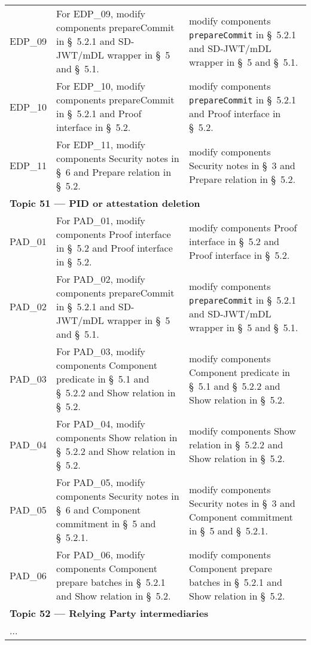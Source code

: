 \begin{landscape}
\begin{longtable}{p{3cm} p{10cm} p{7cm}}
EDP\_09 &
For EDP\_09, modify components prepareCommit in \S~5.2.1 and SD-JWT/mDL wrapper in \S~5 and \S~5.1. &
modify components \texttt{prepareCommit} in \S~5.2.1 and SD-JWT/mDL wrapper in \S~5 and \S~5.1. \\

EDP\_10 &
For EDP\_10, modify components prepareCommit in \S~5.2.1 and Proof interface in \S~5.2. &
modify components \texttt{prepareCommit} in \S~5.2.1 and Proof interface in \S~5.2. \\

EDP\_11 &
For EDP\_11, modify components Security notes in \S~6 and Prepare relation in \S~5.2. &
modify components Security notes in \S~3 and Prepare relation in \S~5.2. \\[1em]


\multicolumn{3}{l}{\textbf{Topic 51 — PID or attestation deletion}}\\

PAD\_01 &
For PAD\_01, modify components Proof interface in \S~5.2 and Proof interface in \S~5.2. &
modify components Proof interface in \S~5.2 and Proof interface in \S~5.2. \\

PAD\_02 &
For PAD\_02, modify components prepareCommit in \S~5.2.1 and SD-JWT/mDL wrapper in \S~5 and \S~5.1. &
modify components \texttt{prepareCommit} in \S~5.2.1 and SD-JWT/mDL wrapper in \S~5 and \S~5.1. \\

PAD\_03 &
For PAD\_03, modify components Component predicate in \S~5.1 and \S~5.2.2 and Show relation in \S~5.2. &
modify components Component predicate in \S~5.1 and \S~5.2.2 and Show relation in \S~5.2. \\

PAD\_04 &
For PAD\_04, modify components Show relation in \S~5.2.2 and Show relation in \S~5.2. &
modify components Show relation in \S~5.2.2 and Show relation in \S~5.2. \\

PAD\_05 &
For PAD\_05, modify components Security notes in \S~6 and Component commitment in \S~5 and \S~5.2.1. &
modify components Security notes in \S~3 and Component commitment in \S~5 and \S~5.2.1. \\

PAD\_06 &
For PAD\_06, modify components Component prepare batches in \S~5.2.1 and Show relation in \S~5.2. &
modify components Component prepare batches in \S~5.2.1 and Show relation in \S~5.2. \\[1em]


\multicolumn{3}{l}{\textbf{Topic 52 — Relying Party intermediaries}}\\

\multicolumn{3}{l}{...} \\

\end{longtable}
\end{landscape}



